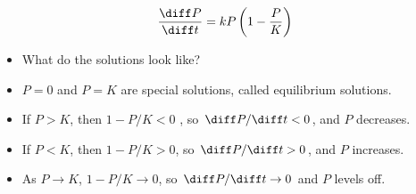 \begin{frame}
\[
\frac{\diff P}{\diff t} = kP\left( 1 - \frac{P}{K}\right)
\]
\begin{itemize}
\item  What do the solutions look like?
\item<2->  $P = 0$ and $P = K$ are special solutions, called equilibrium solutions.
\item<3->  If $P > K$, then $1 - P/K < 0$ , so $\diff P/ \diff t < 0$, and $P$ decreases.
\item<4->  If $P < K$, then $1 - P/K > 0$, so $\diff P/\diff t > 0$, and $P$ increases.
\item<5->  As $P \rightarrow K$, $1 - P/K \rightarrow 0$, so $\diff P/\diff t \rightarrow 0$ and $P$ levels off.
\end{itemize}
\begin{center}
\ %
%
%
%
\end{center}
\end{frame}
